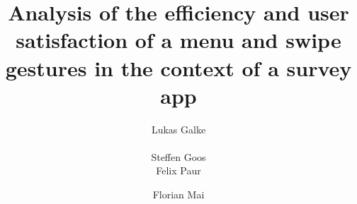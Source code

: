 \documentclass{sig-alternate-05-2015}
\begin{document}





%
\title{Analysis of the efficiency and user satisfaction of a menu and swipe gestures in the context of a survey app}
%
%
%
%
%
%
\author{
%
%
\alignauthor
Lukas Galke\\
       \\
\alignauthor Steffen Goos\\
\alignauthor
Felix Paur\\
\and  %
\alignauthor
Florian Mai\\
}
\end{document}
